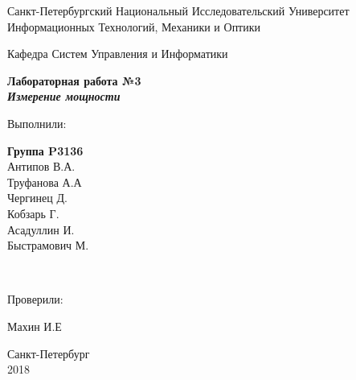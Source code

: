 \begin{titlepage}
  \begin{center}
    \vspace{2cm}
    Санкт-Петербургский Национальный Исследовательский Университет\\
    Информационных Технологий, Механики и Оптики

    \vspace{3cm}

    Кафедра Систем Управления и Информатики

    \vspace{7cm}
    \textbf{Лабораторная работа №3 \\ \textit{Измерение мощности}}
  \end{center}
  \vspace{4cm}
  \hfill
  \parbox[top][4cm][t]{4cm}{Выполнили:}
  \parbox[top][4cm][t]{4cm}{
  \textbf{Группа P3136}\\
  Антипов В.А.\\
  Труфанова А.А\\
  Чергинец Д.\\
  Кобзарь Г.\\
  Асадуллин И.\\
  Быстрамович М.}
  \\

  \hfill
  \parbox[right][4cm][t]{4cm}{Проверили:}
  \parbox[right][4cm][t]{4cm}{
  Махин И.Е}

  \vfill
  \begin{center}
  Санкт-Петербург \\ 2018
  \end{center}
\end{titlepage}